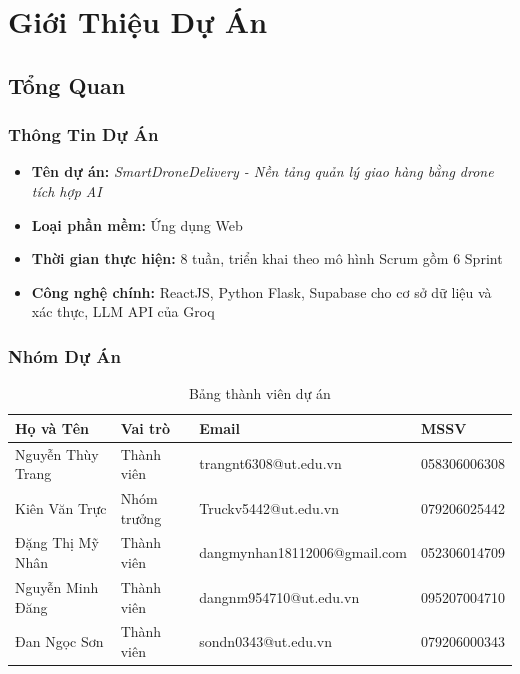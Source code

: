 \chapter{Giới Thiệu Dự Án}

\section{Tổng Quan}

\subsection{Thông Tin Dự Án}

\begin{itemize}
  \item \textbf{Tên dự án:} \textit{SmartDroneDelivery - Nền tảng quản lý giao hàng bằng drone tích hợp AI}
  \item \textbf{Loại phần mềm:} Ứng dụng Web
  \item \textbf{Thời gian thực hiện:} 8 tuần, triển khai theo mô hình Scrum gồm 6 Sprint
  \item \textbf{Công nghệ chính:} ReactJS, Python Flask, Supabase cho cơ sở dữ liệu và xác thực, LLM API của Groq
\end{itemize}

\subsection{Nhóm Dự Án}

\begin{table}[H]
  \centering
  \begin{tabularx}{\textwidth}{|l|l|X|l|}
    \hline
    \textbf{Họ và Tên} & \textbf{Vai trò} & \textbf{Email} & \textbf{MSSV} \\
    \hline
    Nguyễn Thùy Trang & Thành viên    & trangnt6308@ut.edu.vn & 058306006308 \\ \hline
    Kiên Văn Trực    & Nhóm trưởng    & Truckv5442@ut.edu.vn & 079206025442 \\ \hline
    Đặng Thị Mỹ Nhân & Thành viên     & dangmynhan18112006@gmail.com & 052306014709 \\ \hline
    Nguyễn Minh Đăng & Thành viên     & dangnm954710@ut.edu.vn & 095207004710 \\ \hline
    Đan Ngọc Sơn     & Thành viên     & sondn0343@ut.edu.vn & 079206000343 \\
    \hline
  \end{tabularx}
  \caption{Bảng thành viên dự án}
  \label{tab:team}
\end{table}

